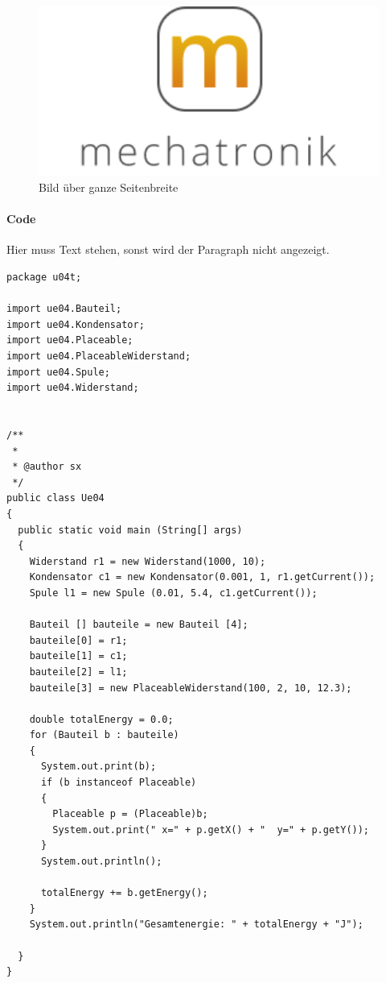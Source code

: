 \begin{figure}[H]
      \includegraphics[width=1\textwidth]{logoMecha}
      \caption{Bild über ganze Seitenbreite}
      \label{Bild über ganze Seitenbreite}
\end{figure}
\newpage

\paragraph{Code} Hier muss Text stehen, sonst wird der Paragraph nicht angezeigt.

\begin{lstlisting}[style=java,caption=Codebeispiel]
package u04t;

import ue04.Bauteil;
import ue04.Kondensator;
import ue04.Placeable;
import ue04.PlaceableWiderstand;
import ue04.Spule;
import ue04.Widerstand;


/**
 *
 * @author sx
 */
public class Ue04
{
  public static void main (String[] args)
  {
    Widerstand r1 = new Widerstand(1000, 10);
    Kondensator c1 = new Kondensator(0.001, 1, r1.getCurrent());
    Spule l1 = new Spule (0.01, 5.4, c1.getCurrent());
    
    Bauteil [] bauteile = new Bauteil [4];
    bauteile[0] = r1;
    bauteile[1] = c1;
    bauteile[2] = l1;
    bauteile[3] = new PlaceableWiderstand(100, 2, 10, 12.3);
    
    double totalEnergy = 0.0;
    for (Bauteil b : bauteile)
    {
      System.out.print(b);
      if (b instanceof Placeable)
      {
        Placeable p = (Placeable)b;
        System.out.print(" x=" + p.getX() + "  y=" + p.getY());
      }
      System.out.println();
      
      totalEnergy += b.getEnergy();
    }
    System.out.println("Gesamtenergie: " + totalEnergy + "J");
    
  }
}

\end{lstlisting}
\newpage

